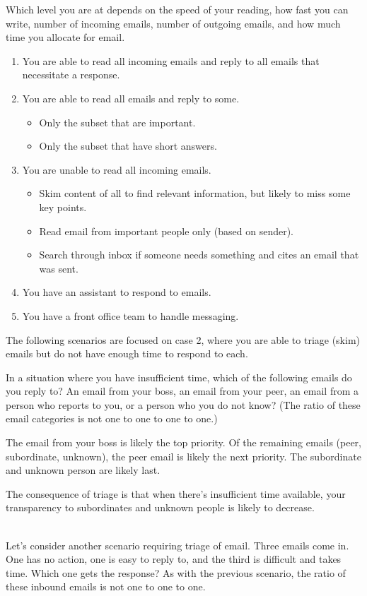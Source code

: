 Which level you are at depends on the speed of your reading, how fast you can write, number of incoming emails, number of outgoing emails, and how much time you allocate for email. 
\begin{enumerate}
    \item You are able to read all incoming emails and reply to all emails that necessitate a response.
    \item You are able to read all emails and reply to some. 
    \begin{itemize}
        \item Only the subset that are important.
        \item Only the subset that have short answers.
    \end{itemize}
    \item You are unable to read all incoming emails. 
    \begin{itemize}
        \item Skim content of all to find relevant information, but likely to miss some key points.
        \item Read email from important people only (based on sender).
        \item Search through inbox if someone needs something and cites an email that was sent.
    \end{itemize}
    \item You have an assistant to respond to emails.
    \item You have a front office team to handle messaging.
\end{enumerate}
The following scenarios are focused on case 2, where you are able to triage (skim) emails but do not have enough time to respond to each.


In a situation where you have insufficient time, which of the following emails do you reply to? An email from your boss, an email from your peer, an email from a person who reports to you, or a person who you do not know?
(The ratio of these email categories is not one to one to one to one.)

The email from your boss is likely the top priority. Of the remaining emails (peer, subordinate, unknown), the peer email is likely the next priority.
The subordinate and unknown person are likely last.

The consequence of triage is that when there's insufficient time available, your transparency to subordinates and unknown people is likely to decrease. 

\ \\
Let's consider another scenario requiring triage of email. Three emails come in. One has no action, one is easy to reply to, and the third is difficult and takes time. Which one gets the response?
As with the previous scenario, the ratio of these inbound emails is not one to one to one.

